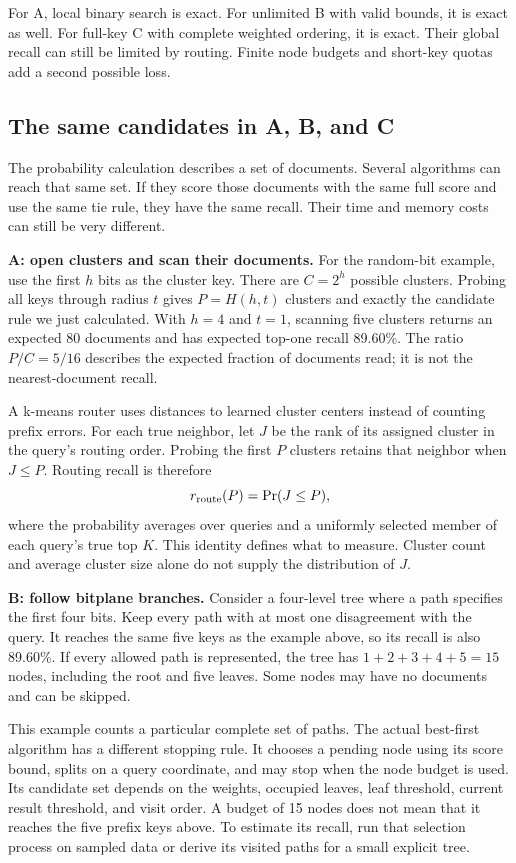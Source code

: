 For A, local binary search is exact. For unlimited B with valid bounds, it is exact as well.
For full-key C with complete weighted ordering, it is exact. Their global recall can still
be limited by routing. Finite node budgets and short-key quotas add a second possible loss.

\subsection{The same candidates in A, B, and C}
The probability calculation describes a set of documents. Several algorithms can reach that
same set. If they score those documents with the same full score and use the same tie rule,
they have the same recall. Their time and memory costs can still be very different.

\textbf{A: open clusters and scan their documents.} For the random-bit example, use the first
$h$ bits as the cluster key. There are $C=2^h$ possible clusters. Probing all keys through
radius $t$ gives $P=H(h,t)$ clusters and exactly the candidate rule we just calculated. With
$h=4$ and $t=1$, scanning five clusters returns an expected 80 documents and has expected
top-one recall 89.60\%. The ratio $P/C=5/16$ describes the expected fraction of documents read;
it is not the nearest-document recall.

A k-means router uses distances to learned cluster centers instead of counting prefix errors. For
each true neighbor, let $J$ be the rank of its assigned cluster in the query's routing order.
Probing the first $P$ clusters retains that neighbor when $J\le P$. Routing recall is therefore
\[
r_{\rm route}(P)=\Pr(J\le P),
\]
where the probability averages over queries and a uniformly selected member of each query's
true top $K$. This identity defines what to measure. Cluster count and average cluster size
alone do not supply the distribution of $J$.

\textbf{B: follow bitplane branches.} Consider a four-level tree where a path specifies the
first four bits. Keep every path with at most one disagreement with the query. It reaches the
same five keys as the example above, so its recall is also 89.60\%. If every allowed path is
represented, the tree has $1+2+3+4+5=15$ nodes, including the root and five leaves. Some nodes
may have no documents and can be skipped.

This example counts a particular complete set of paths. The actual best-first algorithm has
a different stopping rule. It chooses a pending node using its score bound, splits on a query
coordinate, and may stop when the node budget is used. Its candidate set depends on the weights,
occupied leaves, leaf threshold, current result threshold, and visit order. A budget of 15
nodes does not mean that it reaches the five prefix keys above. To estimate its recall, run
that selection process on sampled data or derive its visited paths for a small explicit tree.

